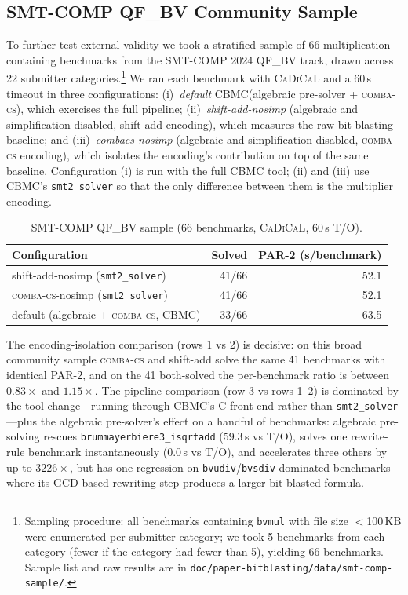 \documentclass[a4paper]{ceurart}
\newcommand{\combacs}{\textsc{comba-cs}\xspace}
\newcommand{\cadical}{\textsc{CaDiCaL}\xspace}
\newcommand{\cbmc}{\textsc{CBMC}\xspace}
\begin{document}
\subsection{SMT-COMP QF\_BV Community Sample}
\label{sec:smt-comp}

To further test external validity we took a stratified sample of
66 multiplication-containing benchmarks from the SMT-COMP 2024
QF\_BV track, drawn across 22 submitter
categories.\footnote{Sampling procedure: all benchmarks containing
\texttt{bvmul} with file size ${<}$100\,KB were enumerated per
submitter category; we took 5 benchmarks from each category
(fewer if the category had fewer than 5), yielding 66 benchmarks.
Sample list and raw results are in
\texttt{doc/paper-bitblasting/data/smt-comp-sample/}.} We ran each
benchmark with \cadical and a 60\,s timeout in three configurations:
(i)~\emph{default} \cbmc (algebraic pre-solver + \combacs), which
exercises the full pipeline;
(ii)~\emph{shift-add-nosimp} (algebraic and simplification
disabled, shift-add encoding), which measures the raw bit-blasting
baseline; and
(iii)~\emph{combacs-nosimp} (algebraic and simplification disabled,
\combacs encoding), which isolates the encoding's contribution on
top of the same baseline. Configuration (i) is run with the full
\cbmc tool; (ii) and (iii) use \cbmc's \texttt{smt2\_solver} so
that the only difference between them is the multiplier encoding.

\begin{table}[ht]
\caption{SMT-COMP QF\_BV sample (66 benchmarks, \cadical, 60\,s T/O).}
\label{tab:smtcomp-sample}
\centering
\begin{tabular}{lrr}
\toprule
Configuration & Solved & PAR-2 (s/benchmark) \\
\midrule
shift-add-nosimp (\texttt{smt2\_solver}) & 41/66 & 52.1 \\
\combacs-nosimp (\texttt{smt2\_solver})  & 41/66 & 52.1 \\
default (algebraic + \combacs, \cbmc)    & 33/66 & 63.5 \\
\bottomrule
\end{tabular}
\end{table}

The encoding-isolation comparison (rows 1 vs 2) is decisive: on
this broad community sample \combacs and shift-add solve the same
41 benchmarks with identical PAR-2, and on the 41 both-solved
the per-benchmark ratio is between $0.83\times$ and $1.15\times$.
The pipeline comparison (row 3 vs rows 1--2) is dominated by the
tool change---running through \cbmc's C front-end rather than
\texttt{smt2\_solver}---plus the algebraic pre-solver's effect on
a handful of benchmarks: algebraic pre-solving rescues
\texttt{brummayerbiere3\_isqrtadd} (59.3\,s vs T/O), solves one
rewrite-rule benchmark instantaneously (0.0\,s vs T/O), and
accelerates three others by up to $3226\times$, but has one
regression on \texttt{bvudiv}/\texttt{bvsdiv}-dominated benchmarks
where its GCD-based rewriting step produces a larger bit-blasted
formula.
\end{document}
